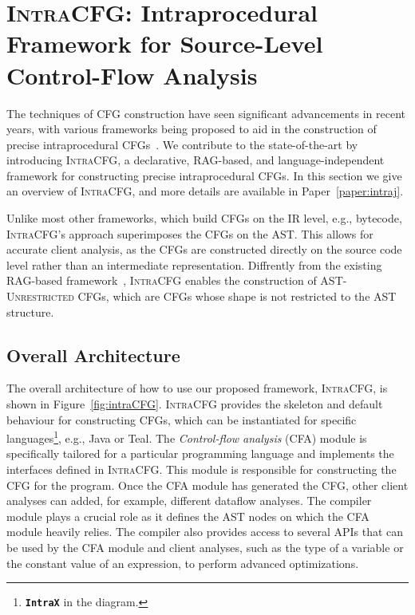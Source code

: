 \section{\textsc{IntraCFG}: Intraprocedural Framework for Source-Level Control-Flow Analysis}%
\label{sec:IntraCFG}
The techniques of CFG construction have seen significant advancements
in recent years, with various frameworks being proposed to aid in the construction
of precise intraprocedural CFGs~\cite{smits2020flowspec,10.1016/j.scico.2012.02.002}.
We contribute to the state-of-the-art by introducing \textsc{IntraCFG}, a declarative, RAG-based,
and language-independent framework for constructing precise intraprocedural CFGs.
In this section we give an overview of \textsc{IntraCFG}, and more details are available
in Paper~\ref{paper:intraj}.

Unlike most other frameworks, which build CFGs on the IR level,
e.g.,  bytecode, \textsc{IntraCFG}'s approach superimposes the CFGs
on the AST. This allows for accurate client analysis,
as the CFGs are constructed directly on the source code level rather than an
intermediate representation.
Diffrently from the existing RAG-based framework~\cite{10.1016/j.scico.2012.02.002},
\textsc{IntraCFG} enables the construction of \textsc{AST-Unrestricted} CFGs,
which are CFGs whose shape is not restricted to the AST structure.
\subsection{Overall Architecture}
The overall architecture of how to use our proposed framework, \textsc{IntraCFG}, is shown in Figure~\ref{fig:intraCFG}.
\textsc{IntraCFG} provides the skeleton and default behaviour for constructing CFGs,
which can be instantiated for specific languages\footnote{\textbf{\texttt{IntraX}} in the diagram.}, e.g., Java or Teal.
The \emph{Control-flow analysis} (CFA) module is specifically tailored for a particular 
programming language and implements the interfaces defined in \textsc{IntraCFG}.
This module is responsible for constructing the CFG for the program. 
Once the CFA module has generated the CFG, 
other client analyses can added, for example, different dataflow analyses.
The compiler module plays a crucial role as it defines the AST nodes
on which the CFA module heavily relies. The compiler also provides access to 
several APIs that can be used by the CFA module and client analyses, such as 
the type of a variable or the constant value of an expression, to perform 
advanced optimizations.

